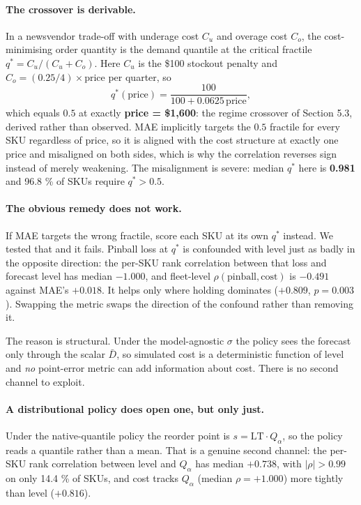\documentclass[11pt]{article}
\begin{document}
\paragraph{The crossover is derivable.} In a newsvendor trade-off with underage
cost $C_u$ and overage cost $C_o$, the cost-minimising order quantity is the
demand quantile at the critical fractile $q^\ast = C_u/(C_u+C_o)$. Here $C_u$
is the \$100 stockout penalty and $C_o = (0.25/4)\times\text{price}$ per
quarter, so
\begin{equation*}
q^\ast(\text{price}) = \frac{100}{100 + 0.0625\,\text{price}},
\end{equation*}
which equals $0.5$ at exactly \textbf{price = \$1{,}600}: the regime crossover
of Section 5.3, derived rather than observed. MAE implicitly targets the $0.5$
fractile for every SKU regardless of price, so it is aligned with the cost
structure at exactly one price and misaligned on both sides, which is why the
correlation reverses sign instead of merely weakening. The misalignment is
severe: median $q^\ast$ here is \textbf{0.981} and 96.8 \% of SKUs require
$q^\ast > 0.5$.

\paragraph{The obvious remedy does not work.} If MAE targets the wrong
fractile, score each SKU at its own $q^\ast$ instead. We tested that and it
fails. Pinball loss at $q^\ast$ is confounded with level just as badly in the
opposite direction: the per-SKU rank correlation between that loss and forecast
level has median $\mathbf{-1.000}$, and fleet-level $\rho(\text{pinball},
\text{cost})$ is $\mathbf{-0.491}$ against MAE's $+0.018$. It helps only where
holding dominates ($+0.809$, $p = 0.003$). Swapping the metric swaps the
direction of the confound rather than removing it.

The reason is structural. Under the model-agnostic $\sigma$ the policy sees the
forecast only through the scalar $\bar{D}$, so simulated cost is a
deterministic function of level and \emph{no} point-error metric can add
information about cost. There is no second channel to exploit.

\paragraph{A distributional policy does open one, but only just.} Under the
native-quantile policy the reorder point is $s = \mathrm{LT}\cdot Q_\alpha$, so
the policy reads a quantile rather than a mean. That is a genuine second
channel: the per-SKU rank correlation between level and $Q_\alpha$ has median
$+0.738$, with $|\rho| > 0.99$ on only 14.4 \% of SKUs, and cost tracks
$Q_\alpha$ (median $\rho = +1.000$) more tightly than level ($+0.816$).
\end{document}
